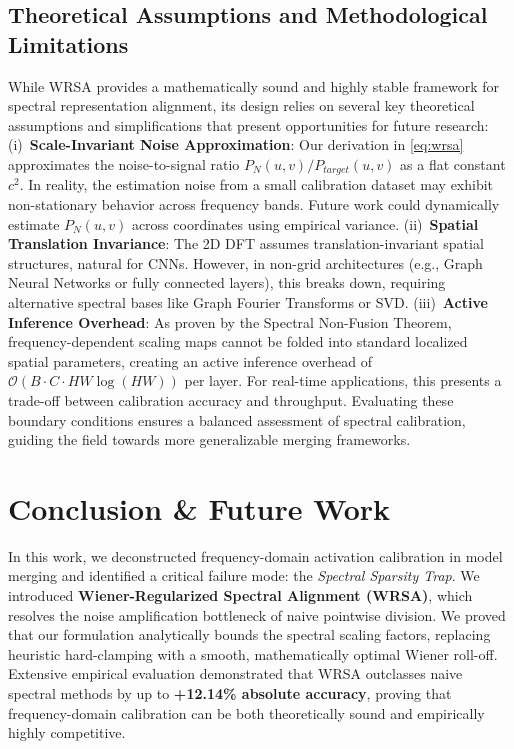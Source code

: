 \documentclass{article}
\theoremstyle{plain}
\theoremstyle{definition}
\theoremstyle{remark}
\begin{document}
\subsection{Theoretical Assumptions and Methodological Limitations}
While WRSA provides a mathematically sound and highly stable framework for spectral representation alignment, its design relies on several key theoretical assumptions and simplifications that present opportunities for future research:
(i)~\textbf{Scale-Invariant Noise Approximation}: Our derivation in \cref{eq:wrsa} approximates the noise-to-signal ratio $P_N(u, v)/P_{target}(u, v)$ as a flat constant $c^2$. In reality, the estimation noise from a small calibration dataset may exhibit non-stationary behavior across frequency bands. Future work could dynamically estimate $P_N(u, v)$ across coordinates using empirical variance.
(ii)~\textbf{Spatial Translation Invariance}: The 2D DFT assumes translation-invariant spatial structures, natural for CNNs. However, in non-grid architectures (e.g., Graph Neural Networks or fully connected layers), this breaks down, requiring alternative spectral bases like Graph Fourier Transforms or SVD.
(iii)~\textbf{Active Inference Overhead}: As proven by the Spectral Non-Fusion Theorem, frequency-dependent scaling maps cannot be folded into standard localized spatial parameters, creating an active inference overhead of $\mathcal{O}(B \cdot C \cdot H W \log(H W))$ per layer. For real-time applications, this presents a trade-off between calibration accuracy and throughput.
Evaluating these boundary conditions ensures a balanced assessment of spectral calibration, guiding the field towards more generalizable merging frameworks.

\section{Conclusion \& Future Work}
\label{sec:conclusion}
In this work, we deconstructed frequency-domain activation calibration in model merging and identified a critical failure mode: the \emph{Spectral Sparsity Trap}. We introduced \textbf{Wiener-Regularized Spectral Alignment (WRSA)}, which resolves the noise amplification bottleneck of naive pointwise division. We proved that our formulation analytically bounds the spectral scaling factors, replacing heuristic hard-clamping with a smooth, mathematically optimal Wiener roll-off. Extensive empirical evaluation demonstrated that WRSA outclasses naive spectral methods by up to \textbf{+12.14\% absolute accuracy}, proving that frequency-domain calibration can be both theoretically sound and empirically highly competitive. 
\end{document}

